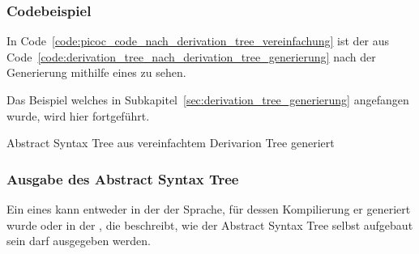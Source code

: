 \subsubsection{Codebeispiel}

In Code~\ref{code:picoc_code_nach_derivation_tree_vereinfachung} ist der  aus Code~\ref{code:derivation_tree_nach_derivation_tree_generierung} nach der Generierung mithilfe eines  zu sehen.

Das Beispiel welches in Subkapitel~\ref{sec:derivation_tree_generierung} angefangen wurde, wird hier fortgeführt.


\begin{code}
  \centering
  \caption{Abstract Syntax Tree aus vereinfachtem Derivarion Tree generiert}
  \label{code:abstract_syntax_tree_aus_vereinfachtem_derivarion_tree_generiert}
\end{code}


\subsubsection{Ausgabe des Abstract Syntax Tree}
\label{sec:ausgabe_von_abstract_syntax_trees}

Ein  eines  kann entweder in der  der Sprache, für dessen Kompilierung er generiert wurde oder in der , die beschreibt, wie der Abstract Syntax Tree selbst aufgebaut sein darf ausgegeben werden.

